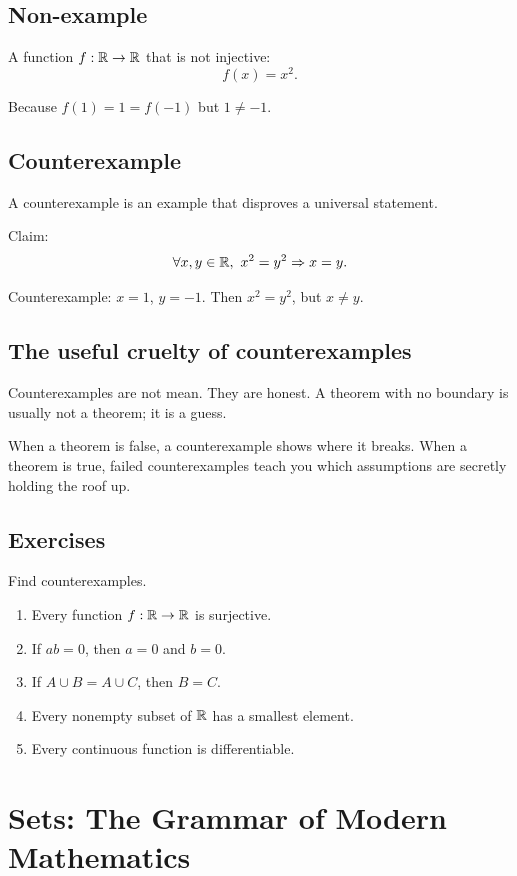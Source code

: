 \documentclass[11pt]{article}
\begin{document}
\subsection{Non-example}

A function $f:\mathbb{R}\to\mathbb{R}$ that is not injective:
\[
f(x)=x^2.
\]

Because $f(1)=1=f(-1)$ but $1\neq -1$.

\subsection{Counterexample}

A counterexample is an example that disproves a universal statement.

Claim:
\[
\forall x,y\in\R,\ x^2=y^2\Rightarrow x=y.
\]

Counterexample: $x=1$, $y=-1$. Then $x^2=y^2$, but $x\neq y$.

\subsection{The useful cruelty of counterexamples}

Counterexamples are not mean. They are honest. A theorem with no boundary is usually not a theorem; it is a guess.

When a theorem is false, a counterexample shows where it breaks. When a theorem is true, failed counterexamples teach you which assumptions are secretly holding the roof up.

\subsection{Exercises}

Find counterexamples.

\begin{enumerate}
\item Every function $f:\mathbb{R}\to\mathbb{R}$ is surjective.
\item If $ab=0$, then $a=0$ and $b=0$.
\item If $A\cup B=A\cup C$, then $B=C$.
\item Every nonempty subset of $\mathbb{R}$ has a smallest element.
\item Every continuous function is differentiable.
\end{enumerate}

\newpage
\section{Sets: The Grammar of Modern Mathematics}
\end{document}
